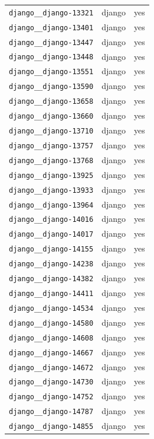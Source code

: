 \begin{longtable}{@{}p{}lp{}@{}}
\texttt{django\_\_django-13321} & django & yes \\
\texttt{django\_\_django-13401} & django & yes \\
\texttt{django\_\_django-13447} & django & yes \\
\texttt{django\_\_django-13448} & django & yes \\
\texttt{django\_\_django-13551} & django & yes \\
\texttt{django\_\_django-13590} & django & yes \\
\texttt{django\_\_django-13658} & django & yes \\
\texttt{django\_\_django-13660} & django & yes \\
\texttt{django\_\_django-13710} & django & yes \\
\texttt{django\_\_django-13757} & django & yes \\
\texttt{django\_\_django-13768} & django & yes \\
\texttt{django\_\_django-13925} & django & yes \\
\texttt{django\_\_django-13933} & django & yes \\
\texttt{django\_\_django-13964} & django & yes \\
\texttt{django\_\_django-14016} & django & yes \\
\texttt{django\_\_django-14017} & django & yes \\
\texttt{django\_\_django-14155} & django & yes \\
\texttt{django\_\_django-14238} & django & yes \\
\texttt{django\_\_django-14382} & django & yes \\
\texttt{django\_\_django-14411} & django & yes \\
\texttt{django\_\_django-14534} & django & yes \\
\texttt{django\_\_django-14580} & django & yes \\
\texttt{django\_\_django-14608} & django & yes \\
\texttt{django\_\_django-14667} & django & yes \\
\texttt{django\_\_django-14672} & django & yes \\
\texttt{django\_\_django-14730} & django & yes \\
\texttt{django\_\_django-14752} & django & yes \\
\texttt{django\_\_django-14787} & django & yes \\
\texttt{django\_\_django-14855} & django & yes \\

\end{longtable}
